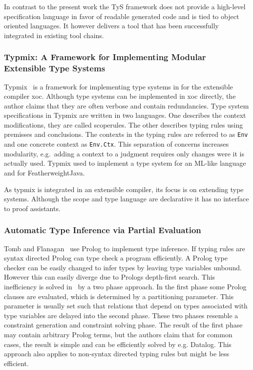 In contrast to the present work the TyS framework does not provide a
high-level specification language in favor of readable generated code
and is tied to object oriented languages. It however delivers a tool
that has been successfully integrated in existing tool chains.
\subsubsection{Typmix: A Framework for Implementing Modular Extensible Type
  Systems}
Typmix~\cite{bergan2007typmix} is a framework for implementing type
systems in for the extensible compiler xoc. Although type systems can
be implemented in xoc directly, the author claims that they are often
verbose and contain redundancies. Type system specifications in Typmix
are written in two languages. One describes the context modifications,
they are called scoperules. The other describes typing rules using
premisses and conclusions. The contexts in the typing rules are
referred to as \verb|Env| and one concrete context as
\verb|Env.Ctx|. This separation of concerns increases modularity,
e.g.\ adding a context to a judgment requires only changes were it is
actually used. Typmix used to implement a type system for an ML-like
language and for FeatherweightJava.

As typmix is integrated in an extensible compiler, its focus is on
extending type systems. Although the scope and type language are
declarative it has no interface to proof assistants.

\subsubsection{Automatic Type Inference via Partial Evaluation}
Tomb and Flanagan~\cite{tomb2005automatic} use Prolog to implement
type inference. If typing rules are syntax directed Prolog can type
check a program efficiently. A Prolog type checker can be easily
changed to infer types by leaving type variables unbound. However this
can easily diverge due to Prologs depth-first search. This
inefficiency is solved in~\cite{tomb2005automatic} by a two phase
approach. In the first phase some Prolog clauses are evaluated, which
is determined by a partitioning parameter. This parameter is usually
set such that relations that depend on types associated with type
variables are delayed into the second phase. These two phases resemble
a constraint generation and constraint solving phase. The result of
the first phase may contain arbitrary Prolog terms, but the authors
claim that for common cases, the result is simple and can be
efficiently solved by e.g. Datalog. This approach also applies to
non-syntax directed typing rules but might be less efficient.

